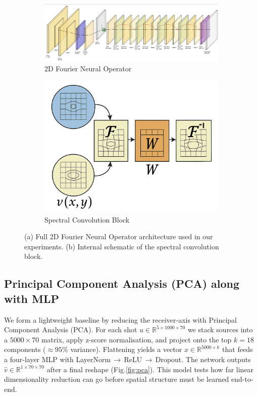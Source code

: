 \documentclass{article}
\begin{document}
\begin{figure}
    \centering
    \begin{subfigure}[b]{0.6\linewidth}
        \centering
        \includegraphics[width=\linewidth]{figures/FNO2D.png}
        \caption{2D Fourier Neural Operator}
    \end{subfigure}
    \hfill
    \begin{subfigure}[b]{0.3\linewidth}
        \centering
        \includegraphics[width=\linewidth]{figures/spectralconv2d.png}
        \caption{Spectral Convolution Block}
    \end{subfigure}
    \caption{(a) Full 2D Fourier Neural Operator architecture used in our experiments. (b) Internal schematic of the spectral convolution block.}
    \label{fig:fno-2d}
\end{figure}

\subsection{Principal Component Analysis (PCA) along with MLP} 

We form a lightweight baseline by reducing the receiver-axis with
Principal Component Analysis (PCA).
For each shot $u\!\in\!\mathbb R^{5\times1000\times70}$ we stack sources
into a $5000\times70$ matrix, apply z-score normalisation,
and project onto the top $k=18$ components
($\!\approx\!95\%$ variance).
Flattening yields a vector
$x\in\mathbb R^{5000\times k}$ that feeds a
four-layer MLP with
LayerNorm\,$\to$\,ReLU\,$\to$\,Dropout.
The network outputs $\hat v\in\mathbb R^{1\times70\times70}$
after a final reshape (Fig.\ref{fig:pca}).
This model tests how far linear dimensionality reduction can go
before spatial structure must be learned end-to-end.
\end{document}
